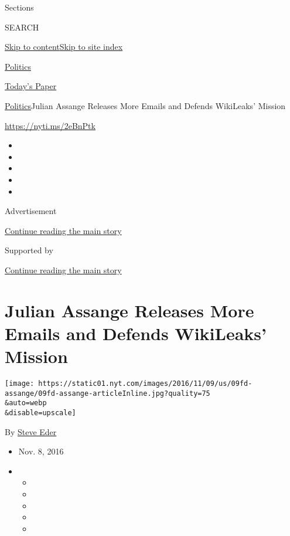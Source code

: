 Sections

SEARCH

\protect\hyperlink{site-content}{Skip to
content}\protect\hyperlink{site-index}{Skip to site index}

\href{https://www.nytimes.com/section/politics}{Politics}

\href{https://myaccount.nytimes.com/auth/login?response_type=cookie\&client_id=vi}{}

\href{https://www.nytimes.com/section/todayspaper}{Today's Paper}

\href{/section/politics}{Politics}\textbar{}Julian Assange Releases More
Emails and Defends WikiLeaks' Mission

\url{https://nyti.ms/2eBnPtk}

\begin{itemize}
\item
\item
\item
\item
\item
\end{itemize}

Advertisement

\protect\hyperlink{after-top}{Continue reading the main story}

Supported by

\protect\hyperlink{after-sponsor}{Continue reading the main story}

\hypertarget{julian-assange-releases-more-emails-and-defends-wikileaks-mission}{%
\section{Julian Assange Releases More Emails and Defends WikiLeaks'
Mission}\label{julian-assange-releases-more-emails-and-defends-wikileaks-mission}}

\texttt{[image: https://static01.nyt.com/images/2016/11/09/us/09fd-assange/09fd-assange-articleInline.jpg?quality=75\\\&auto=webp\\\&disable=upscale]}

By \href{http://www.nytimes.com/by/steve-eder}{Steve Eder}

\begin{itemize}
\item
  Nov. 8, 2016
\item
  \begin{itemize}
  \item
  \item
  \item
  \item
  \item
  \end{itemize}
\end{itemize}


